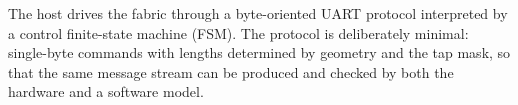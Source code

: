 The host drives the fabric through a byte-oriented UART protocol interpreted by
a control finite-state machine (FSM). The protocol is deliberately minimal:
single-byte commands with lengths determined by geometry and the tap mask,
so that the same
message stream can be produced and checked by both the hardware and a software
model.
